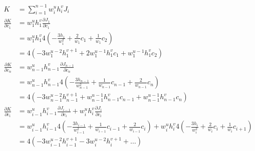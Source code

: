 \documentclass{article}
\begin{document}

\begin{align*}
  K &= \sum_{i=1}^{n-1}w_i^uh_i^vJ_i \\
  \frac{\partial K}{\partial c_1}
  &= w_1^uh_1^v\frac{\partial J_1}{\partial c_1} \\
  &= w_1^uh_1^v4\left(-\frac{3h_1}{w_1^2}+\frac{2}{w_1}c_1+\frac{1}{w_1}c_2\right) \\
  &= 4\left(-3w_1^{u-2}h_1^{v+1}+2w_1^{u-1}h_1^vc_1+w_1^{u-1}h_1^vc_2\right) \\
  \frac{\partial K}{\partial c_n}
  &= w_{n-1}^uh_{n-1}^v\frac{\partial J_{n-1}}{\partial c_n} \\
  &= w_{n-1}^uh_{n-1}^v4\left(-\frac{3h_{n-1}}{w_{n-1}^2}+\frac{1}{w_{n-1}}c_{n-1}+\frac{2}{w_{n-1}}c_n\right) \\
  &= 4\left(-3w_{n-1}^{u-2}h_{n-1}^{v+1}+w_{n-1}^{u-1}h_{n-1}^vc_{n-1}+w_{n-1}^{u-1}h_{n-1}^vc_n\right) \\
  \frac{\partial K}{\partial c_i}
  &= w_{i-1}^uh_{i-1}^v\frac{\partial J_{i-1}}{\partial c_i}
  + w_i^uh_i^v\frac{\partial J_i}{\partial c_i} \\
  &= w_{i-1}^uh_{i-1}^v4\left(-\frac{3h_{i-1}}{w_{i-1}^2}+\frac{1}{w_{i-1}}c_{i-1}+\frac{2}{w_{i-1}}c_i\right)
  + w_i^uh_i^v4\left(-\frac{3h_i}{w_i^2}+\frac{2}{w_i}c_i+\frac{1}{w_i}c_{i+1}\right) \\
  &= 4\left(
  -3w_{i-1}^{u-2}h_{i-1}^{v+1}-3w_i^{u-2}h_i^{v+1}+\ldots
  \right)
\end{align*}
\end{document}

